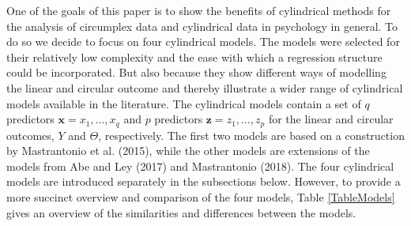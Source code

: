 \documentclass[man,mask]{apa6}
\begin{document}
One of the goals of this paper is to show the benefits of cylindrical methods
for the analysis of circumplex data and cylindrical data in psychology in
general. To do so we decide to focus on four cylindrical models. The models were
selected for their relatively low complexity and the ease with which a
regression structure could be incorporated. But also because they show different
ways of modelling the linear and circular outcome and thereby illustrate a
wider range of cylindrical models available in the literature. The
cylindrical models contain a set of \(q\) predictors \(\boldsymbol{x} = x_1, \dots, x_q\) and \(p\) predictors \(\boldsymbol{z} = z_1, \dots, z_p\) for the linear and
circular outcomes, \(Y\) and \(\Theta\), respectively. The first two models are
based on a construction by Mastrantonio et al. (2015), while the other models are
extensions of the models from Abe and Ley (2017) and Mastrantonio (2018). The
four cylindrical models are introduced separately in the subsections below.
However, to provide a more succinct overview and comparison of the four models, Table
\ref{TableModels} gives an overview of the similarities and differences between
the models.
\end{document}
